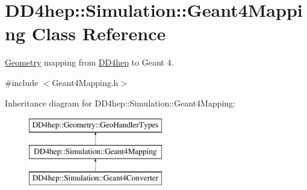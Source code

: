 \hypertarget{class_d_d4hep_1_1_simulation_1_1_geant4_mapping}{}\section{D\+D4hep\+:\+:Simulation\+:\+:Geant4\+Mapping Class Reference}
\label{class_d_d4hep_1_1_simulation_1_1_geant4_mapping}


\hyperlink{namespace_d_d4hep_1_1_geometry}{Geometry} mapping from \hyperlink{namespace_d_d4hep}{D\+D4hep} to Geant 4.  




{\ttfamily \#include $<$Geant4\+Mapping.\+h$>$}

Inheritance diagram for D\+D4hep\+:\+:Simulation\+:\+:Geant4\+Mapping\+:\begin{figure}[H]
\begin{center}
\leavevmode
\includegraphics[height=3.000000cm]{class_d_d4hep_1_1_simulation_1_1_geant4_mapping}
\end{center}
\end{figure}
